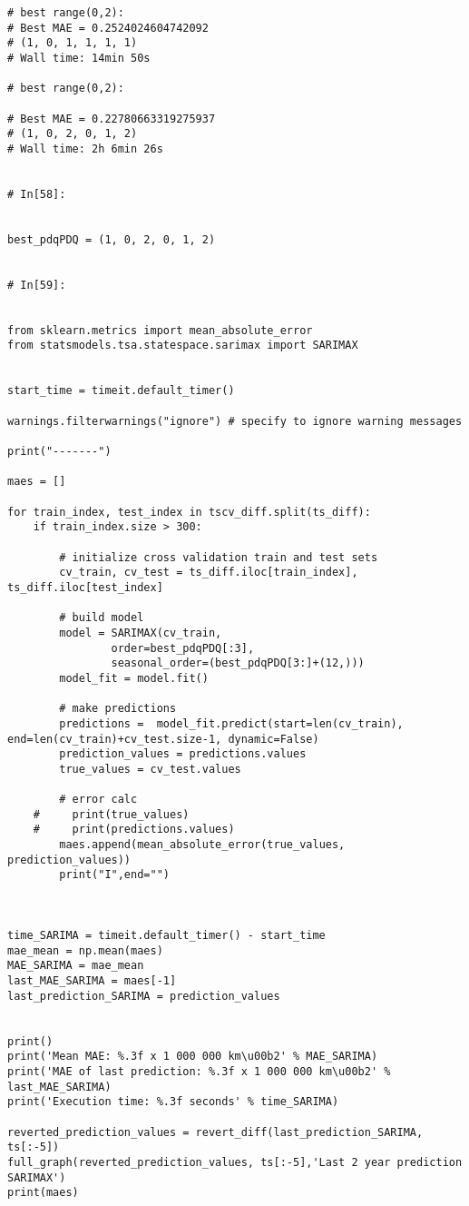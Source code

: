 \begin{verbatim}
# best range(0,2):
# Best MAE = 0.2524024604742092
# (1, 0, 1, 1, 1, 1)
# Wall time: 14min 50s

# best range(0,2):

# Best MAE = 0.22780663319275937
# (1, 0, 2, 0, 1, 2)
# Wall time: 2h 6min 26s


# In[58]:


best_pdqPDQ = (1, 0, 2, 0, 1, 2)


# In[59]:


from sklearn.metrics import mean_absolute_error
from statsmodels.tsa.statespace.sarimax import SARIMAX


start_time = timeit.default_timer()

warnings.filterwarnings("ignore") # specify to ignore warning messages

print("-------")

maes = []

for train_index, test_index in tscv_diff.split(ts_diff):
    if train_index.size > 300:

        # initialize cross validation train and test sets
        cv_train, cv_test = ts_diff.iloc[train_index], ts_diff.iloc[test_index]

        # build model
        model = SARIMAX(cv_train, 
                order=best_pdqPDQ[:3], 
                seasonal_order=(best_pdqPDQ[3:]+(12,)))
        model_fit = model.fit()

        # make predictions
        predictions =  model_fit.predict(start=len(cv_train), end=len(cv_train)+cv_test.size-1, dynamic=False)
        prediction_values = predictions.values
        true_values = cv_test.values

        # error calc
    #     print(true_values)
    #     print(predictions.values)
        maes.append(mean_absolute_error(true_values, prediction_values))
        print("I",end="")



time_SARIMA = timeit.default_timer() - start_time
mae_mean = np.mean(maes)
MAE_SARIMA = mae_mean
last_MAE_SARIMA = maes[-1]
last_prediction_SARIMA = prediction_values


print()
print('Mean MAE: %.3f x 1 000 000 km\u00b2' % MAE_SARIMA)
print('MAE of last prediction: %.3f x 1 000 000 km\u00b2' % last_MAE_SARIMA)
print('Execution time: %.3f seconds' % time_SARIMA)

reverted_prediction_values = revert_diff(last_prediction_SARIMA, ts[:-5])
full_graph(reverted_prediction_values, ts[:-5],'Last 2 year prediction SARIMAX')
print(maes)



\end{verbatim}
